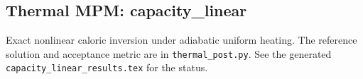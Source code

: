 \subsection{Thermal MPM: capacity\_linear}
Exact nonlinear caloric inversion under adiabatic uniform heating. The reference solution and acceptance metric are in \texttt{thermal\_post.py}. See the generated \texttt{capacity\_linear\_results.tex} for the status.
